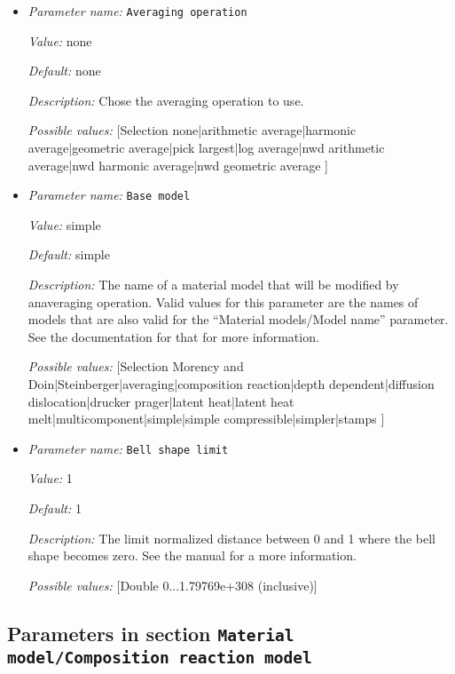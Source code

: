 \begin{itemize}
\item {\it Parameter name:} {\tt Averaging operation}
\label{parameters:Material model/Averaging/Averaging operation}


{\it Value:} none


{\it Default:} none


{\it Description:} Chose the averaging operation to use.


{\it Possible values:} [Selection none|arithmetic average|harmonic average|geometric average|pick largest|log average|nwd arithmetic average|nwd harmonic average|nwd geometric average ]
\item {\it Parameter name:} {\tt Base model}
\label{parameters:Material model/Averaging/Base model}


{\it Value:} simple


{\it Default:} simple


{\it Description:} The name of a material model that will be modified by anaveraging operation. Valid values for this parameter are the names of models that are also valid for the ``Material models/Model name'' parameter. See the documentation for that for more information.


{\it Possible values:} [Selection Morency and Doin|Steinberger|averaging|composition reaction|depth dependent|diffusion dislocation|drucker prager|latent heat|latent heat melt|multicomponent|simple|simple compressible|simpler|stamps ]
\item {\it Parameter name:} {\tt Bell shape limit}
\label{parameters:Material model/Averaging/Bell shape limit}


{\it Value:} 1


{\it Default:} 1


{\it Description:} The limit normalized distance between 0 and 1 where the bell shape becomes zero. See the manual for a more information.


{\it Possible values:} [Double 0...1.79769e+308 (inclusive)]
\end{itemize}

\subsection{Parameters in section \tt Material model/Composition reaction model}
\label{parameters:Material_20model/Composition_20reaction_20model}

